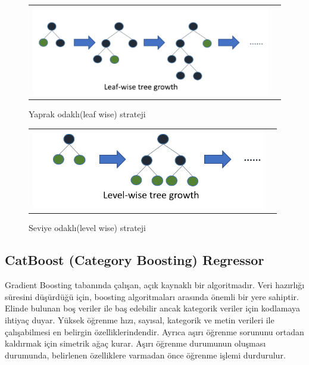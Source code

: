 \documentclass[conference]{IEEEtran}
\begin{document}
\begin{figure}[!h]
	\centering
	\begin{center}
		\begin{tabular}{cc}
			\includegraphics[scale=0.5]{pictures/pic_05.png}&
		\end{tabular}
	\end{center}
	\caption{Yaprak odaklı(leaf wise) strateji\cite{13}}
	\label{fig:05}
\end{figure}

\begin{figure}[!h]
	\centering
	\begin{center}
		\begin{tabular}{cc}
			\includegraphics[scale=0.5]{pictures/pic_06.png}&
		\end{tabular}
	\end{center}
	\caption{Seviye odaklı(level wise) strateji\cite{13}}
	\label{fig:06}
\end{figure}
\pagebreak

\subsection{\textbf{CatBoost (Category Boosting) Regressor}}
\quad Gradient Boosting tabanında çalışan, açık kaynaklı bir algoritmadır. Veri hazırlığı süresini düşürdüğü için, boosting algoritmaları arasında önemli bir yere sahiptir. Elinde bulunan boş veriler ile baş edebilir ancak kategorik veriler için kodlamaya ihtiyaç duyar. Yüksek öğrenme hızı, sayısal, kategorik ve metin verileri ile çalışabilmesi en belirgin özelliklerindendir. Ayrıca aşırı öğrenme sorununu ortadan kaldırmak için simetrik ağaç kurar. Aşırı öğrenme durumunun oluşması durumunda, belirlenen özelliklere varmadan önce öğrenme işlemi durdurulur\cite{14}.
\end{document}
